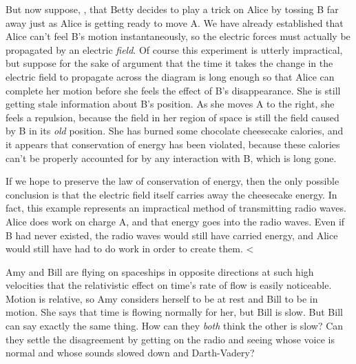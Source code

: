 But now suppose, , that Betty decides to play a trick on Alice
by tossing B far away just as Alice is getting ready to move A.
We have already established that Alice can't feel B's motion instantaneously, so the electric forces
must actually be propagated by an electric \emph{field}. Of course this experiment is
utterly impractical, but suppose for the sake of argument that the time it takes the change in the electric field
to propagate across the diagram is long enough so that Alice can complete her motion before she feels the
effect of B's disappearance. She is still getting stale information about B's position. As she moves A to the
right, she feels a repulsion, because the field in her region of space is still the field caused by
B in its \emph{old} position. She has burned some chocolate cheesecake calories, and it appears that
conservation of energy has been violated, because these calories can't be properly accounted for
by any interaction with B, which is long gone.

If we hope to preserve the law of conservation of energy, then the only possible conclusion is that
the electric field itself carries away the cheesecake energy. In fact, this example
represents an impractical method of transmitting radio waves. Alice does work on charge A, and that energy
goes into the radio waves. Even if B had never existed, the radio waves would still have carried energy,
and Alice would still have had to do work in order to create them.
<%

\startdqs

\begin{dq}
Amy and Bill are flying on spaceships in opposite directions at such high velocities that
the relativistic effect on time's rate of flow is easily noticeable.
Motion is relative, so Amy considers herself to be at rest and Bill to be in motion. She says that
time is flowing normally for her, but Bill is slow. But Bill can say exactly the same thing.
How can they \emph{both} think the other is slow? Can they settle the disagreement by getting
on the radio and seeing whose voice is normal and whose sounds slowed down and Darth-Vadery?
\end{dq}


